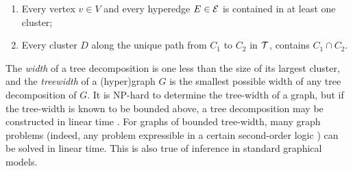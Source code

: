 \documentclass{article}
\begin{document}
\begin{enumerate}[itemsep=0pt]
    \item Every vertex $v \in V$ and every hyperedge $E \in \mathcal E$ is contained in at least one cluster;
        \item Every cluster $D$ along the unique path from $C_1$ to $C_2$ in $\cal T$,
         contains $C_1 \cap C_2$.
\end{enumerate}

The \emph{width} of a tree decomposition is one less than the size of its largest cluster,
and the \emph{treewidth} of a (hyper)graph $G$ is the smallest possible width of any tree decomposition of $G$.
It is NP-hard to determine the tree-width of a graph, but if the tree-width is known to be bounded above, a tree decomposition may be constructed in linear time \parencite{bodlaender1993linear}.
For graphs of bounded tree-width, many graph problems 
(indeed, any problem expressible in a certain second-order logic \parencite{courcelle1990})
can be solved in
linear time.
This is also true of inference in standard graphical models.
\end{document}
